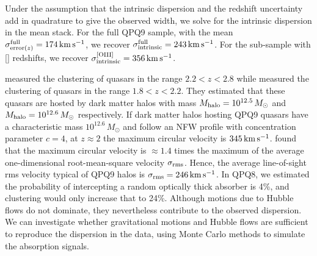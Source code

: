 \documentclass[iop]{emulateapj}
\begin{document}
Under the assumption that the intrinsic dispersion and the redshift uncertainty add in 
quadrature to give the observed width, we solve for the intrinsic dispersion in the  
mean stack. For the full QPQ9 sample, with the mean 
$\sigma_{{\rm error}(z)}^{\rm full}=174\,{\rm km\,s^{-1}}$, we recover 
$\sigma_{\rm intrinsic}^{\rm full}=243\,{\rm km\,s^{-1}}$. For the sub-sample with [] 
redshifts, we recover $\sigma_{\rm intrinsic}^{\rm [OIII]}=356\,{\rm km\,s^{-1}}$. 

\cite{Eftekharzadeh+15} measured the clustering of quasars in the range $2.2<z<2.8$ while 
\cite{RodriguezTorres+17} measured the clustering of quasars in the range $1.8<z<2.2$. They 
estimated that these quasars are hosted by dark matter halos with mass 
$M_{\rm halo}=10^{12.5}\,M_\odot$ and $M_{\rm halo}=10^{12.6}\,M_\odot$ respectively. If dark
matter halos hosting QPQ9 quasars have a characteristic mass $10^{12.6}\,M_\odot$ and follow an 
NFW profile \citep{NavarroFrenkWhite97} with concentration parameter $c=4$, at $z\approx2$ the
maximum circular velocity is $345\,{\rm km\,s^{-1}}$. \cite{TormenBouchetWhite97} found that the
maximum circular velocity is $\approx1.4$ times the maximum of the average one-dimensional
root-mean-square velocity $\sigma_{\rm rms}$. Hence, the average line-of-sight rms velocity
typical of QPQ9 halos is $\sigma_{\rm rms}=246\,{\rm km\,s^{-1}}$. 
In QPQ8, we estimated the probability of intercepting a random optically thick absorber is 4\%, 
and clustering would only increase that to 24\%. 
Although motions due to Hubble flows do not dominate, they nevertheless contribute to the observed 
dispersion. 
We can investigate
whether gravitational motions and Hubble flows are sufficient to reproduce the dispersion in the
data, using Monte Carlo methods to simulate the absorption signals.
\end{document}

